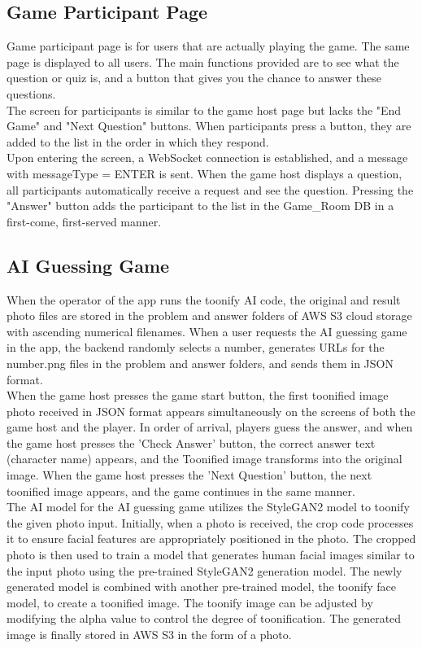 \documentclass[conference]{IEEEtran}
\begin{document}
    \subsection{Game Participant Page}
        Game participant page is for users that are actually playing the game. The same page is displayed to all users. The main functions provided are to see what the question or quiz is, and a button that gives you the chance to answer these questions. \\
        The screen for participants is similar to the game host page but lacks the "End Game" and "Next Question" buttons. When participants press a button, they are added to the list in the order in which they respond. \\
    	Upon entering the screen, a WebSocket connection is established, and a message with messageType = ENTER is sent. When the game host displays a question, all participants automatically receive a request and see the question. Pressing the "Answer" button adds the participant to the list in the Game\_Room DB in a first-come, first-served manner.

    \subsection{AI Guessing Game}
        When the operator of the app runs the toonify AI code, the original and result photo files are stored in the problem and answer folders of AWS S3 cloud storage with ascending numerical filenames. When a user requests the AI guessing game in the app, the backend randomly selects a number, generates URLs for the number.png files in the problem and answer folders, and sends them in JSON format.\\
        When the game host presses the game start button, the first toonified image photo received in JSON format appears simultaneously on the screens of both the game host and the player. In order of arrival, players guess the answer, and when the game host presses the 'Check Answer' button, the correct answer text (character name) appears, and the Toonified image transforms into the original image. When the game host presses the 'Next Question' button, the next toonified image appears, and the game continues in the same manner.\\
        The AI model for the AI guessing game utilizes the StyleGAN2 model to toonify the given photo input. Initially, when a photo is received, the crop code processes it to ensure facial features are appropriately positioned in the photo. The cropped photo is then used to train a model that generates human facial images similar to the input photo using the pre-trained StyleGAN2 generation model. The newly generated model is combined with another pre-trained model, the toonify face model, to create a toonified image. The toonify image can be adjusted by modifying the alpha value to control the degree of toonification. The generated image is finally stored in AWS S3 in the form of a photo.
\end{document}
